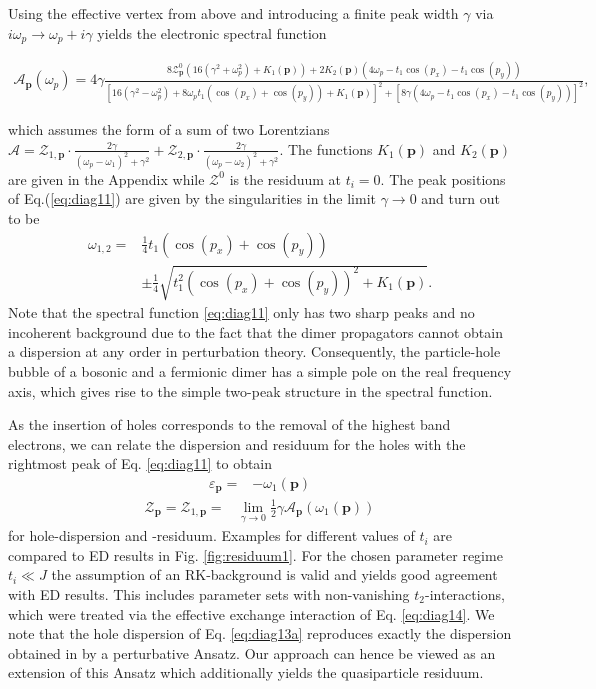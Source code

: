 \documentclass[aps,pra,reprint,showpacs,superscriptaddress]{revtex4-1}
\newcommand\bs[1]{\ensuremath{\boldsymbol{#1}}}
\begin{document}
Using the effective vertex from above and introducing a finite peak width $\gamma$ via $i\omega_p\rightarrow \omega_p+i\gamma$ yields the electronic spectral function
\begin{widetext}
\begin{align}
\mathcal{A}_{\bs{p}}(\omega_p)= 4\gamma\frac{8\mathcal{Z}_{\bs{p}}^0\left( 16\left(\gamma^2+\omega_p^2\right)+K_1(\bs{p})\right)+2K_2(\bs{p})\left(4\omega_p-t_1\cos (p_x)-t_1\cos (p_y)\right)}{\left[16\left(\gamma^2-\omega_p^2\right)+8\omega_pt_1\left(\cos (p_x)+\cos (p_y)\right)+K_1(\bs{p})\right]^2+\left[8\gamma\left(4\omega_p-t_1\cos (p_x)-t_1\cos (p_y)\right)\right]^2},\label{eq:diag11}
\end{align}
\end{widetext}
which assumes the form  of a sum of two  Lorentzians $\mathcal{A}=\mathcal{Z}_{1,\bs{p}}\cdot\frac{2\gamma}{(\omega_p-\omega_1)^2+\gamma^2}+\mathcal{Z}_{2,\bs{p}}\cdot\frac{2\gamma}{(\omega_p-\omega_2)^2+\gamma^2}$. The functions $K_1(\bs{p})$ and $K_2(\bs{p})$ are given in the Appendix while $\mathcal{Z}^0$ is the residuum at $t_i=0$. The peak positions of Eq.(\ref{eq:diag11}) are given by the singularities in the limit $\gamma\rightarrow 0$ and turn out to be 
\begin{align}
\omega_{1,2}=&\frac{1}{4}t_1\left(\cos (p_x)+\cos (p_y)\right) \label{eq:diag12} \\
&\pm\frac{1}{4}\sqrt{t_1^2\left(\cos (p_x)+\cos (p_y)\right)^2+K_1(\bs{p})}. \nonumber
\end{align}
Note that the spectral function \eqref{eq:diag11} only has two sharp peaks and no incoherent background due to the fact that the dimer propagators cannot obtain a dispersion at any order in perturbation theory. Consequently, the particle-hole bubble of a bosonic and a fermionic dimer has a simple pole on the real frequency axis, which gives rise to the simple two-peak structure in the spectral function.

As the insertion of holes corresponds to the removal of the highest band electrons, we can relate the dispersion and residuum for the holes with the rightmost peak of Eq. \eqref{eq:diag11} to obtain
\begin{align}
\varepsilon_{\bs{p}}=&-\omega_1 (\bs{p}) \label{eq:diag13a}
\end{align}
\begin{align}
\mathcal{Z}_{\bs{p}}=\mathcal{Z}_{1,\bs{p}}=&\lim_{\gamma\rightarrow 0}\frac{1}{2}\gamma\mathcal{A}_{\bs{p}}(\omega_1(\bs{p})) \label{eq:diag13b}
\end{align}
for hole-dispersion and -residuum. Examples for different values of $t_i$ are compared to ED results in Fig. \ref{fig:residuum1}. For the chosen parameter regime $t_i\ll J$ the assumption of an RK-background is valid and yields good agreement with ED results. This includes parameter sets with non-vanishing $t_2$-interactions, which were treated via the effective exchange interaction of Eq. \eqref{eq:diag14}. We note that the hole dispersion of Eq. \eqref{eq:diag13a} reproduces exactly the dispersion obtained in \cite{punk2015quantum} by a perturbative Ansatz. Our approach can hence be viewed as an extension of this Ansatz which additionally yields the quasiparticle residuum.
\end{document}
